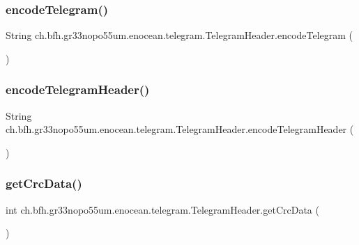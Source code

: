 \subsubsection{\texorpdfstring{encode\+Telegram()}{encodeTelegram()}}
{\footnotesize\ttfamily String ch.\+bfh.\+gr33nopo55um.\+enocean.\+telegram.\+Telegram\+Header.\+encode\+Telegram (\begin{DoxyParamCaption}{ }\end{DoxyParamCaption})}

\hypertarget{classch_1_1bfh_1_1gr33nopo55um_1_1enocean_1_1telegram_1_1_telegram_header_a799277c6c3e567bc1a17b3eff93244ab}{}\label{classch_1_1bfh_1_1gr33nopo55um_1_1enocean_1_1telegram_1_1_telegram_header_a799277c6c3e567bc1a17b3eff93244ab} 
\subsubsection{\texorpdfstring{encode\+Telegram\+Header()}{encodeTelegramHeader()}}
{\footnotesize\ttfamily String ch.\+bfh.\+gr33nopo55um.\+enocean.\+telegram.\+Telegram\+Header.\+encode\+Telegram\+Header (\begin{DoxyParamCaption}{ }\end{DoxyParamCaption})}

\hypertarget{classch_1_1bfh_1_1gr33nopo55um_1_1enocean_1_1telegram_1_1_telegram_header_a5df9e708d1076ada3e4ad5584400f01c}{}\label{classch_1_1bfh_1_1gr33nopo55um_1_1enocean_1_1telegram_1_1_telegram_header_a5df9e708d1076ada3e4ad5584400f01c} 
\subsubsection{\texorpdfstring{get\+Crc\+Data()}{getCrcData()}}
{\footnotesize\ttfamily int ch.\+bfh.\+gr33nopo55um.\+enocean.\+telegram.\+Telegram\+Header.\+get\+Crc\+Data (\begin{DoxyParamCaption}{ }\end{DoxyParamCaption})}

